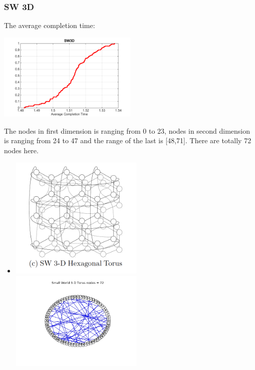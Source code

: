 \documentclass[11pt]{article}
\begin{document}
\subsubsection{SW 3D}
The average completion time: \\
\centerline{\includegraphics[width=0.5\textwidth]{figure/picture/SW3D.png}}
The nodes in first dimension is ranging from 0 to 23, nodes in second dimension is ranging from 24 to 47 and the range of the last is [48,71]. There are totally 72 nodes here. 
\begin{itemize}
	\item \centerline{}
	\includegraphics[width=0.5\textwidth]{figure/draw/SW3D_original}
	\includegraphics[width=0.5\textwidth]{figure/draw/SW3D.png}
\end{itemize}
\end{document}
